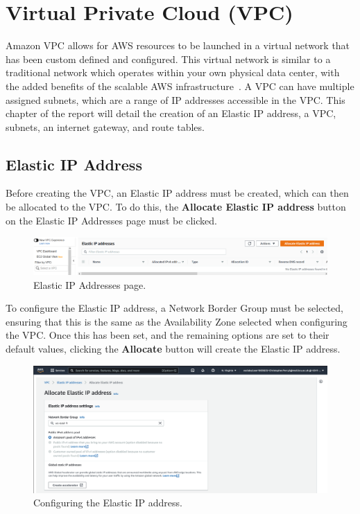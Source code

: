 \chapter{Virtual Private Cloud (VPC)}\label{ch:vpc}

Amazon VPC allows for AWS resources to be launched in a virtual network that has been custom defined and configured.
This virtual network is similar to a traditional network which operates within your own physical data center, with the
added benefits of the scalable AWS infrastructure~\parencite{amazon2022what}.
A VPC can have multiple assigned subnets, which are a range of IP addresses accessible in the VPC\@.
This chapter of the report will detail the creation of an Elastic IP address, a VPC, subnets, an internet gateway, and
route tables.

\section{Elastic IP Address}\label{sec:elastic-ip-address}

Before creating the VPC, an Elastic IP address must be created, which can then be allocated to the VPC\@.
To do this, the \textbf{Allocate Elastic IP address} button on the Elastic IP Addresses page must be clicked.

\begin{figure}[!htbp]
    \centering
    \includegraphics[width=\textwidth]{resources/vpc/blank_elastic}
    \caption{Elastic IP Addresses page.}
    \label{fig:blank-elastic}
\end{figure}

To configure the Elastic IP address, a Network Border Group must be selected, ensuring that this is the same as the
Availability Zone selected when configuring the VPC\@.
Once this has been set, and the remaining options are set to their default values, clicking the \textbf{Allocate} button
will create the Elastic IP address.

\clearpage
\begin{figure}[!htbp]
    \centering
    \includegraphics[width=\textwidth]{resources/vpc/vpc_elastic_ip_addresses}
    \caption{Configuring the Elastic IP address.}
    \label{fig:config-elastic}
\end{figure}

